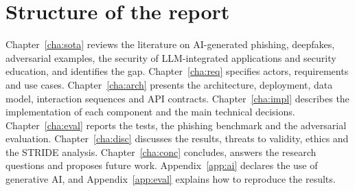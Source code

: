 \section{Structure of the report}
\label{sec:structure}

Chapter~\ref{cha:sota} reviews the literature on AI-generated phishing, deepfakes, adversarial examples, the security of LLM-integrated applications and security education, and identifies the gap. Chapter~\ref{cha:req} specifies actors, requirements and use cases. Chapter~\ref{cha:arch} presents the architecture, deployment, data model, interaction sequences and API contracts. Chapter~\ref{cha:impl} describes the implementation of each component and the main technical decisions. Chapter~\ref{cha:eval} reports the tests, the phishing benchmark and the adversarial evaluation. Chapter~\ref{cha:disc} discusses the results, threats to validity, ethics and the STRIDE analysis. Chapter~\ref{cha:conc} concludes, answers the research questions and proposes future work. Appendix~\ref{app:ai} declares the use of generative AI, and Appendix~\ref{app:eval} explains how to reproduce the results.
